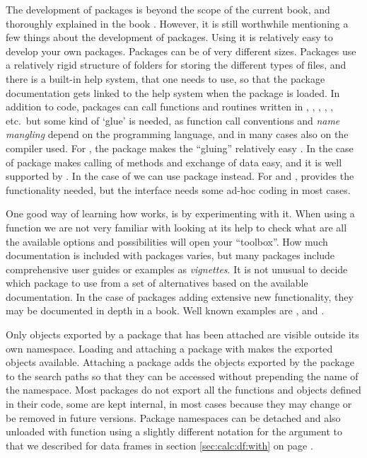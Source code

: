 \documentclass[krantz2]{krantz}\usepackage{knitr}%
\begin{document}
The development of packages is beyond the scope of the current book, and thoroughly explained in the book  \autocite{Wickham2015}. However, it is still worthwhile mentioning a few things about the development of \Rpgrm packages. Using \RStudio it is relatively easy to develop your own packages. Packages can be of very different sizes. Packages use a relatively rigid structure of folders for storing the different types of files, and there is a built-in help system, that one needs to use, so that the package documentation gets linked to the \Rlang help system when the package is loaded. In addition to \Rlang code, packages can call functions and routines written in , , , , , etc.\ but some kind of `glue' is needed, as function call conventions and \emph{name mangling} depend on the programming language, and in many cases also on the compiler used. For , the   package makes the ``gluing'' relatively easy \autocite{Eddelbuettel2013}. In the case of  package  makes calling of  methods and exchange of data easy, and it is well supported by \RStudio. In the case of  we can use package  instead. For  and , \Rlang provides the functionality needed, but the interface needs some ad-hoc coding in most cases.

One good way of learning how \Rlang works, is by experimenting with it. When using a function we are not very familiar with looking at its help to check what are all the available options and possibilities will open your ``toolbox''. How much documentation is included with packages varies, but many packages include comprehensive user guides or examples as \emph{vignettes}. It is not unusual to decide which package to use from a set of alternatives based on the available documentation. In the case of packages adding extensive new functionality, they may be documented in depth in a book. Well known examples are  \autocite{Pinheiro2000},  \autocite{Sarkar2008} and  \autocite{Wickham2016}.

Only objects exported by a package that has been attached are visible outside its own namespace. Loading and attaching a package with  makes the exported objects available. Attaching a package adds the objects exported by the package to the search paths so that they can be accessed without prepending the name of the namespace. Most packages do not export all the functions and objects defined in their code, some are kept internal, in most cases because they may change or be removed in future versions. Package namespaces can be detached and also unloaded with function  using a slightly different notation for the argument to that we described for data frames in section \ref{sec:calc:df:with} on page \pageref{sec:calc:df:with}.
\end{document}
